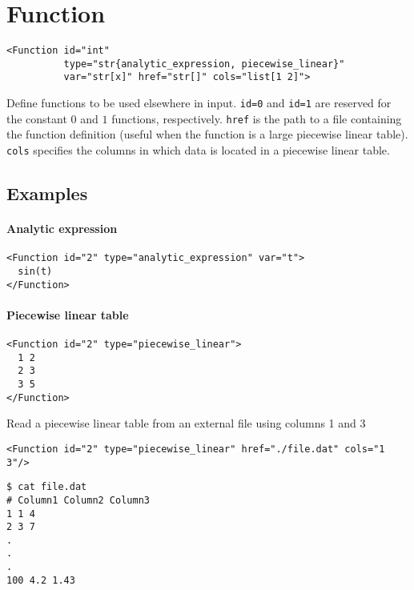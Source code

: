 \documentclass[11pt]{report}
\begin{document}
\section{Function}
\begin{verbatim}
<Function id="int"
          type="str{analytic_expression, piecewise_linear}"
          var="str[x]" href="str[]" cols="list[1 2]">
\end{verbatim}
%
Define functions to be used elsewhere in input. \texttt{id=0} and
\texttt{id=1} are reserved for the constant $0$ and $1$ functions,
respectively. \texttt{href} is the path to a file containing the function
definition (useful when the function is a large piecewise linear table).
\texttt{cols} specifies the columns in which data is located in a piecewise
linear table.

\subsection{Examples}
\paragraph{Analytic expression}
%
\begin{verbatim}
<Function id="2" type="analytic_expression" var="t">
  sin(t)
</Function>
\end{verbatim}

\paragraph{Piecewise linear table}
%
\begin{verbatim}
<Function id="2" type="piecewise_linear">
  1 2
  2 3
  3 5
</Function>
\end{verbatim}
%
Read a piecewise linear table from an external file using columns 1 and 3
%
\begin{verbatim}
<Function id="2" type="piecewise_linear" href="./file.dat" cols="1 3"/>
\end{verbatim}

\begin{verbatim}
$ cat file.dat
# Column1 Column2 Column3
1 1 4
2 3 7
.
.
.
100 4.2 1.43
\end{verbatim}

\end{document}
